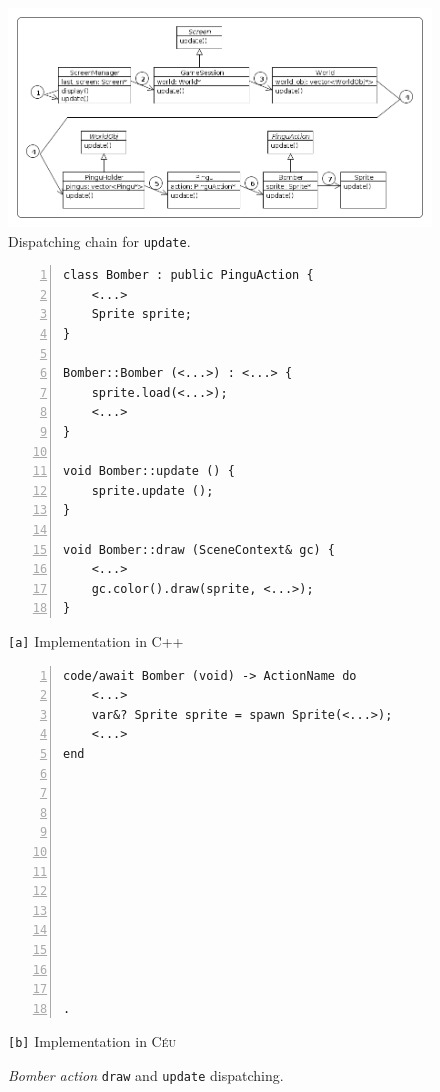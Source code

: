 \documentclass{vgtc}                          %
\newcommand{\CEU}{\textsc{C\'{e}u}\xspace}
\newcommand{\code}[1] {{\small{\texttt{#1}}}}
\newcommand{\ax}{\code{[a]}\xspace}
\newcommand{\bx}{\code{[b]}\xspace}
\begin{document}
\begin{figure}[t]
\centering
\includegraphics[width=\columnwidth]{hierarchy}
\caption{Dispatching chain for \code{update}.
\label{fig.hier}
}
\end{figure}

\begin{figure}[t]
\begin{minipage}[t]{0.50\linewidth}
\begin{lstlisting}[numbers=left,xleftmargin=3em]
class Bomber : public PinguAction {
    <...>
    Sprite sprite;
}

Bomber::Bomber (<...>) : <...> {
    sprite.load(<...>);
    <...>
}

void Bomber::update () {
    sprite.update ();
}

void Bomber::draw (SceneContext& gc) {
    <...>
    gc.color().draw(sprite, <...>);
}
\end{lstlisting}
\centering\small{\ax Implementation in C++}
\end{minipage}
%
\begin{minipage}[t]{0.50\linewidth}
\begin{lstlisting}[numbers=left,xleftmargin=3em]
code/await Bomber (void) -> ActionName do
    <...>
    var&? Sprite sprite = spawn Sprite(<...>);
    <...>
end












.
\end{lstlisting}
\centering\small{\bx Implementation in \CEU}
\end{minipage}
\caption{ \emph{Bomber action} \code{draw} and \code{update} dispatching.
\label{lst.hier}
}
\end{figure}
\end{document}
